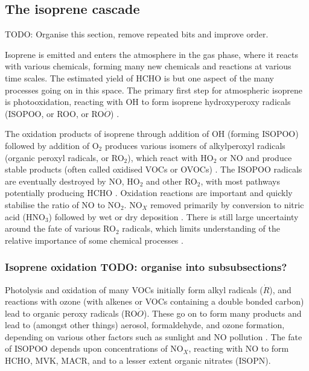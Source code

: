   \subsection{The isoprene cascade}
    \label{LR:IsopAndVOCs:IsopCascade}
    TODO: Organise this section, remove repeated bits and improve order.
    
    Isoprene is emitted and enters the atmosphere in the gas phase, where it reacts with various chemicals, forming many new chemicals and reactions at various time scales.
    The estimated yield of HCHO is but one aspect of the many processes going on in this space.
    The primary first step for atmospheric isoprene is photooxidation, reacting with OH to form isoprene hydroxyperoxy radicals (ISOPOO, or ROO, or RO$\dot{O}$) \citep{Wolfe2016,Marvin2017,Patchen2017}.
    
    The oxidation products of isoprene through addition of OH (forming ISOPOO) followed by addition of O$_2$ produces various isomers of alkylperoxyl radicals (organic peroxyl radicals, or RO$_2$), which react with HO$_2$ or NO and produce stable products (often called oxidised VOCs or OVOCs) \citep{Nguyen2014}.
    The ISOPOO radicals are eventually destroyed by NO, HO$_2$ and other RO$_2$, with most pathways potentially producing HCHO \citep{Wolfe2016}.
    Oxidation reactions are important and quickly stabilise the ratio of NO to NO$_2$. 
    NO$_X$ removed primarily by conversion to nitric acid (HNO$_3$) followed by wet or dry deposition \citep{Ayers2006}.
    There is still large uncertainty around the fate of various RO$_2$ radicals, which limits understanding of the relative importance of some chemical processes \citep{Crounse2013}.
    
    \subsubsection{Isoprene oxidation TODO: organise into subsubsections?}
      Photolysis and oxidation of many VOCs initially form alkyl radicals ($\dot{R}$), and reactions with ozone (with alkenes or VOCs containing a double bonded carbon) lead to organic peroxy radicals (RO$\dot{O}$). 
      These go on to form many products and lead to (amongst other things) aerosol, formaldehyde, and ozone formation, depending on various other factors such as sunlight and NO pollution \citep{Atkinson2000}.
      The fate of ISOPOO depends upon concentrations of NO$_X$, reacting with NO to form HCHO, MVK, MACR, and to a lesser extent organic nitrates (ISOPN).
      
